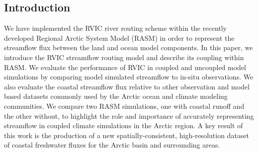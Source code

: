 \documentclass[jgrga, draft]{agutex}
\begin{document}
%

\begin{article}

%
%

\section{Introduction}
\label{sec:intro}
We have implemented the RVIC river routing scheme within the recently developed Regional Arctic System Model (RASM) \citep{Roberts_2015a,Hamman_2016} in order to represent the streamflow flux between the land and ocean model components.
In this paper, we introduce the RVIC streamflow routing model and describe its coupling within RASM.
We evaluate the performance of RVIC in coupled and uncoupled model simulations by comparing model simulated streamflow to in-situ observations.
We also evaluate the coastal streamflow flux relative to other observation and model based datasets commonly used by the Arctic ocean and climate modeling communities.
We compare two RASM simulations, one with coastal runoff and the other without, to highlight the role and importance of accurately representing streamflow in coupled climate simulations in the Arctic region.
A key result of this work is the production of a new spatially-consistent, high-resolution dataset of coastal freshwater fluxes for the Arctic basin and surrounding areas.


\end{article}
\end{document}
